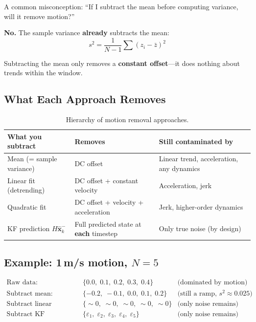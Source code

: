 \documentclass[11pt,a4paper]{article}
\begin{document}
A common misconception: ``If I subtract the mean before computing variance, will it remove motion?''

\textbf{No.} The sample variance \textbf{already} subtracts the mean:
\begin{equation}
    s^2 = \frac{1}{N-1}\sum(z_i - \bar{z})^2
\end{equation}

Subtracting the mean only removes a \textbf{constant offset}---it does nothing about trends within the window.

\subsection{What Each Approach Removes}

\begin{table}[H]
\centering
\begin{tabular}{@{}p{4cm}p{4cm}p{4.5cm}@{}}
\toprule
\textbf{What you subtract} & \textbf{Removes} & \textbf{Still contaminated by} \\
\midrule
Mean (= sample variance) & DC offset & Linear trend, acceleration, any dynamics \\
Linear fit (detrending) & DC offset + constant velocity & Acceleration, jerk \\
Quadratic fit & DC offset + velocity + acceleration & Jerk, higher-order dynamics \\
KF prediction $H\hat{\mathbf{x}}_k^-$ & Full predicted state at \textbf{each} timestep & Only true noise (by design) \\
\bottomrule
\end{tabular}
\caption{Hierarchy of motion removal approaches.}
\end{table}

\subsection{Example: 1\,m/s motion, $N = 5$}

\begin{align}
    \text{Raw data:} &\quad \{0.0,\; 0.1,\; 0.2,\; 0.3,\; 0.4\} & \text{(dominated by motion)} \\
    \text{Subtract mean:} &\quad \{-0.2,\; -0.1,\; 0.0,\; 0.1,\; 0.2\} & \text{(still a ramp, } s^2 \approx 0.025\text{)} \\
    \text{Subtract linear trend:} &\quad \{\sim 0,\; \sim 0,\; \sim 0,\; \sim 0,\; \sim 0\} & \text{(only noise remains)} \\
    \text{Subtract KF prediction:} &\quad \{\varepsilon_1,\; \varepsilon_2,\; \varepsilon_3,\; \varepsilon_4,\; \varepsilon_5\} & \text{(only noise remains)}
\end{align}
\end{document}
